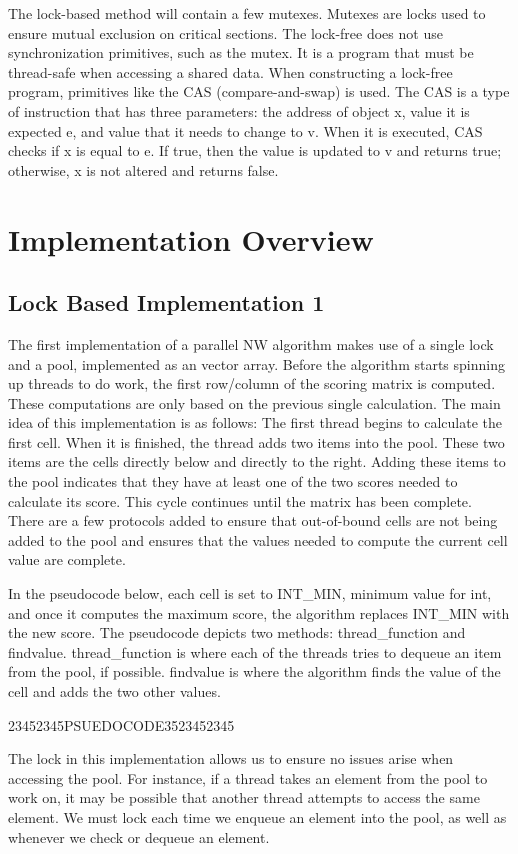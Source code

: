 \documentclass[letterpaper, 10 pt, conference]{IEEEconf}
\begin{document}
The lock-based method will contain a few mutexes. Mutexes are locks used to ensure mutual exclusion on critical sections. The lock-free does not use synchronization primitives, such as the mutex. It is a program that must be thread-safe when accessing a shared data. When constructing a lock-free program, primitives like the CAS (compare-and-swap) is used. The CAS is a type of instruction that has three parameters: the address of object x, value it is expected e, and value that it needs to change to v. When it is executed, CAS checks if x is equal to e. If true, then the value is updated to v and returns true; otherwise, x is not altered and returns false. 

\section{Implementation Overview}
\subsection{Lock Based Implementation 1}
The first implementation of a parallel NW algorithm makes use of a single lock and a pool, implemented as an vector array. Before the algorithm starts spinning up threads to do work, the first row/column of the scoring matrix is computed. These computations are only based on the previous single calculation. The main idea of this implementation is as follows: The first thread begins to calculate the first cell. When it is finished, the thread adds two items into the pool. These two items are the cells directly below and directly to the right. Adding these items to the pool indicates that they have at least one of the two scores needed to calculate its score. This cycle continues until the matrix has been complete. There are a few protocols added to ensure that out-of-bound cells are not being added to the pool and ensures that the values needed to compute the current cell value are complete. 

In the pseudocode below, each cell is set to INT\_MIN, minimum value for int, and once it computes the maximum score, the algorithm replaces INT\_MIN with the new score. The pseudocode depicts two methods: thread\_function and findvalue. thread\_function is where each of the threads tries to dequeue an item from the pool, if possible. findvalue is where the algorithm finds the value of the cell and adds the two other values. 

23452345PSUEDOCODE3523452345


The lock in this implementation allows us to ensure no issues arise when accessing the pool. For instance, if a thread takes an element from the pool to work on, it may be possible that another thread attempts to access the same element. We must lock each time we enqueue an element into the pool, as well as whenever we check or dequeue an element. 
\end{document}
